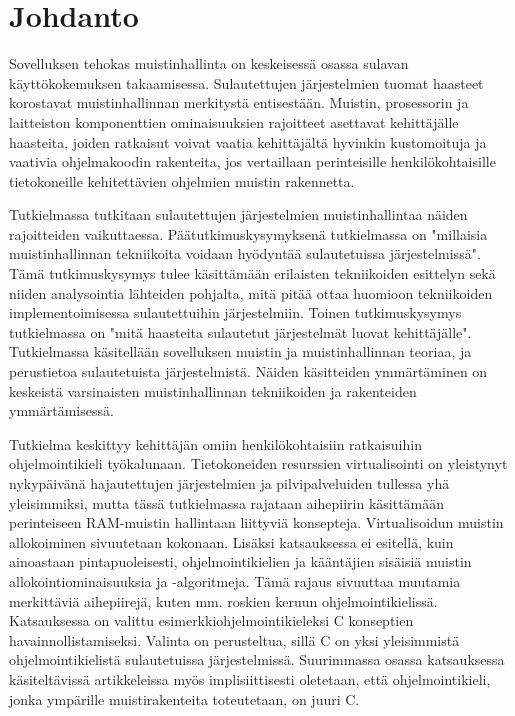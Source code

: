 \chapter{Johdanto} \label{Johdanto}

Sovelluksen tehokas muistinhallinta on keskeisessä osassa sulavan käyttökokemuksen takaamisessa. Sulautettujen järjestelmien tuomat haasteet korostavat muistinhallinnan merkitystä entisestään. Muistin, prosessorin ja laitteiston komponenttien ominaisuuksien rajoitteet asettavat kehittäjälle haasteita, joiden ratkaisut voivat vaatia kehittäjältä hyvinkin kustomoituja ja vaativia ohjelmakoodin rakenteita, jos vertaillaan perinteisille henkilökohtaisille tietokoneille kehitettävien ohjelmien muistin rakennetta.

Tutkielmassa tutkitaan sulautettujen järjestelmien muistinhallintaa näiden rajoitteiden vaikuttaessa. Päätutkimuskysymyksenä tutkielmassa on "millaisia muistinhallinnan tekniikoita voidaan hyödyntää sulautetuissa järjestelmissä". Tämä tutkimuskysymys tulee käsittämään erilaisten tekniikoiden esittelyn sekä niiden analysointia lähteiden pohjalta, mitä pitää ottaa huomioon tekniikoiden implementoimisessa sulautettuihin järjestelmiin. Toinen tutkimuskysymys tutkielmassa on "mitä haasteita sulautetut järjestelmät luovat kehittäjälle". Tutkielmassa käsitellään sovelluksen muistin ja muistinhallinnan teoriaa, ja perustietoa sulautetuista järjestelmistä. Näiden käsitteiden ymmärtäminen on keskeistä varsinaisten muistinhallinnan tekniikoiden ja rakenteiden ymmärtämisessä.

Tutkielma keskittyy kehittäjän omiin henkilökohtaisiin ratkaisuihin ohjelmointikieli työkalunaan. Tietokoneiden resurssien virtualisointi on yleistynyt nykypäivänä hajautettujen järjestelmien ja pilvipalveluiden tullessa yhä yleisimmiksi, mutta tässä tutkielmassa rajataan aihepiirin käsittämään perinteiseen RAM-muistin hallintaan liittyviä konsepteja. Virtualisoidun muistin allokoiminen sivuutetaan kokonaan. Lisäksi katsauksessa ei esitellä, kuin ainoastaan pintapuoleisesti, ohjelmointikielien ja kääntäjien sisäisiä muistin allokointiominaisuuksia ja -algoritmeja. Tämä rajaus sivuuttaa muutamia merkittäviä aihepiirejä, kuten mm. roskien keruun ohjelmointikielissä. Katsauksessa on valittu esimerkkiohjelmointikieleksi C konseptien havainnollistamiseksi. Valinta on perusteltua, sillä C on yksi yleisimmistä ohjelmointikielistä sulautetuissa järjestelmissä. Suurimmassa osassa katsauksessa käsiteltävissä artikkeleissa myös implisiittisesti oletetaan, että ohjelmointikieli, jonka ympärille muistirakenteita toteutetaan, on juuri C.

